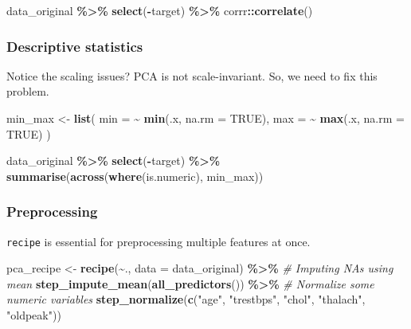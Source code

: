 \documentclass[
]{book}
\newenvironment{Shaded}{\begin{snugshade}}{\end{snugshade}}
\newcommand{\AttributeTok}[1]{\textcolor[rgb]{0.13,0.29,0.53}{#1}}
\newcommand{\CommentTok}[1]{\textcolor[rgb]{0.56,0.35,0.01}{\textit{#1}}}
\newcommand{\ConstantTok}[1]{\textcolor[rgb]{0.56,0.35,0.01}{#1}}
\newcommand{\FunctionTok}[1]{\textcolor[rgb]{0.13,0.29,0.53}{\textbf{#1}}}
\newcommand{\NormalTok}[1]{#1}
\newcommand{\OtherTok}[1]{\textcolor[rgb]{0.56,0.35,0.01}{#1}}
\newcommand{\SpecialCharTok}[1]{\textcolor[rgb]{0.81,0.36,0.00}{\textbf{#1}}}
\newcommand{\StringTok}[1]{\textcolor[rgb]{0.31,0.60,0.02}{#1}}
\begin{document}
\begin{Shaded}
\begin{Highlighting}[]
\NormalTok{data\_original }\SpecialCharTok{\%\textgreater{}\%}
  \FunctionTok{select}\NormalTok{(}\SpecialCharTok{{-}}\NormalTok{target) }\SpecialCharTok{\%\textgreater{}\%}
\NormalTok{  corrr}\SpecialCharTok{::}\FunctionTok{correlate}\NormalTok{()}
\end{Highlighting}
\end{Shaded}

\subsubsection{Descriptive statistics}\label{descriptive-statistics}

Notice the scaling issues? PCA is not scale-invariant. So, we need to fix this problem.

\begin{Shaded}
\begin{Highlighting}[]
\NormalTok{min\_max }\OtherTok{\textless{}{-}} \FunctionTok{list}\NormalTok{(}
  \AttributeTok{min =} \SpecialCharTok{\textasciitilde{}} \FunctionTok{min}\NormalTok{(.x, }\AttributeTok{na.rm =} \ConstantTok{TRUE}\NormalTok{),}
  \AttributeTok{max =} \SpecialCharTok{\textasciitilde{}} \FunctionTok{max}\NormalTok{(.x, }\AttributeTok{na.rm =} \ConstantTok{TRUE}\NormalTok{)}
\NormalTok{)}

\NormalTok{data\_original }\SpecialCharTok{\%\textgreater{}\%}
  \FunctionTok{select}\NormalTok{(}\SpecialCharTok{{-}}\NormalTok{target) }\SpecialCharTok{\%\textgreater{}\%}
  \FunctionTok{summarise}\NormalTok{(}\FunctionTok{across}\NormalTok{(}\FunctionTok{where}\NormalTok{(is.numeric), min\_max))}
\end{Highlighting}
\end{Shaded}

\subsubsection{Preprocessing}\label{preprocessing}

\texttt{recipe} is essential for preprocessing multiple features at once.

\begin{Shaded}
\begin{Highlighting}[]
\NormalTok{pca\_recipe }\OtherTok{\textless{}{-}} \FunctionTok{recipe}\NormalTok{(}\SpecialCharTok{\textasciitilde{}}\NormalTok{., }\AttributeTok{data =}\NormalTok{ data\_original) }\SpecialCharTok{\%\textgreater{}\%}
  \CommentTok{\# Imputing NAs using mean}
  \FunctionTok{step\_impute\_mean}\NormalTok{(}\FunctionTok{all\_predictors}\NormalTok{()) }\SpecialCharTok{\%\textgreater{}\%}
  \CommentTok{\# Normalize some numeric variables}
  \FunctionTok{step\_normalize}\NormalTok{(}\FunctionTok{c}\NormalTok{(}\StringTok{"age"}\NormalTok{, }\StringTok{"trestbps"}\NormalTok{, }\StringTok{"chol"}\NormalTok{, }\StringTok{"thalach"}\NormalTok{, }\StringTok{"oldpeak"}\NormalTok{))}
\end{Highlighting}
\end{Shaded}
\end{document}
